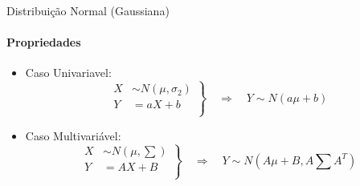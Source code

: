 \documentclass{beamer}
\begin{document}
\begin{frame}{Distribuição Normal (Gaussiana)}
    \framesubtitle{Propriedades}
    \begin{itemize}
        \item Caso Univariavel:
        \begin{equation}
            \left.
            \begin{aligned}
                    X & \sim N\left(\mu, \sigma_2\right)\\
                    Y & = aX + b\\
            \end{aligned} \right\}
            \quad \Rightarrow \quad Y \sim N\left(a\mu+b\right)
        \end{equation}
        \item Caso Multivariável:
        \begin{equation}
            \left.
            \begin{aligned}
                    X & \sim N\left(\mu, \textstyle\sum\right)\\
                    Y & = AX + B\\
            \end{aligned} \right\}
            \quad \Rightarrow \quad Y \sim N\left( A\mu+B, A\textstyle\sum A^T \right)
        \end{equation}
    \end{itemize}
\end{frame}
\end{document}
